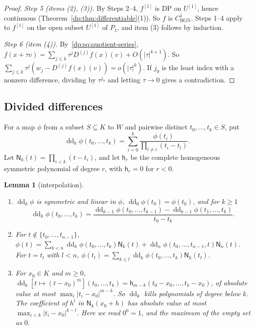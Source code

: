 \documentclass[11pt]{amsart}
\newtheorem{lemma}[theorem]{Lemma}
\theoremstyle{definition}
\theoremstyle{remark}
\numberwithin{equation}{section}
\newcommand{\abs}[1]{\lvert #1\rvert}
\theoremstyle{plain}
\theoremstyle{definition}
\theoremstyle{plain}
\begin{document}
\begin{proof}
\emph{Step 5 (items (2), (3)).} By Steps 2--4, $f^{[1]}$ is DP on $U^{[1]}$, hence continuous (Theorem~\ref{dp:thm:differentiable}(1)). So $f$ is $C^1_{\mathrm{BGN}}$. Steps 1--4 apply to $f^{[1]}$ on the open subset $U^{[1]}$ of $P_1$, and item (3) follows by induction.

\emph{Step 6 (item (4)).} By~\eqref{dp:sq:quotient-series}, $f(x+\tau v)=\sum_{j\le k}\tau^jD^{(j)}f(x)(v)+O(\abs\tau^{k+1})$. So $\sum_{j\le k}\tau^j(w_j-D^{(j)}f(x)(v))=o(\abs\tau^k)$. If $j_0$ is the least index with a nonzero difference, dividing by $\tau^{j_0}$ and letting $\tau\to0$ gives a contradiction.
\end{proof}

\subsection{Divided differences}\label{dp:sq:ssec-divided}

For a map $\phi$ from a subset $S\subseteq K$ to $W$ and pairwise distinct $t_0,\dots,t_k\in S$, put
\[
 \operatorname{dd}_k\phi(t_0,\dots,t_k)=\sum_{i=0}^k\frac{\phi(t_i)}{\prod_{l\ne i}(t_i-t_l)}.
\]
Let $\mathsf N_k(t)=\prod_{i<k}(t-t_i)$, and let $\mathsf h_r$ be the complete homogeneous symmetric polynomial of degree $r$, with $\mathsf h_r=0$ for $r<0$.

\begin{lemma}[interpolation]\label{dp:sq:interpolation}
\leavevmode
\begin{enumerate}
\item $\operatorname{dd}_k\phi$ is symmetric and linear in $\phi$, $\operatorname{dd}_0\phi(t_0)=\phi(t_0)$, and for $k\ge1$
\begin{equation}\label{dp:sq:dd-recursion}
 \operatorname{dd}_k\phi(t_0,\dots,t_k)=\frac{\operatorname{dd}_{k-1}\phi(t_0,\dots,t_{k-1})-\operatorname{dd}_{k-1}\phi(t_1,\dots,t_k)}{t_0-t_k}.
\end{equation}
\item For $t\notin\{t_0,\dots,t_{n-1}\}$,
$\phi(t)=\sum_{k<n}\operatorname{dd}_k\phi(t_0,\dots,t_k)\mathsf N_k(t)+\operatorname{dd}_n\phi(t_0,\dots,t_{n-1},t)\mathsf N_n(t)$. For $t=t_l$ with $l<n$, $\phi(t_l)=\sum_{k\le l}\operatorname{dd}_k\phi(t_0,\dots,t_k)\mathsf N_k(t_l)$.
\item For $x_0\in K$ and $m\ge0$, $\operatorname{dd}_k[t\mapsto(t-x_0)^m](t_0,\dots,t_k)=\mathsf h_{m-k}(t_0-x_0,\dots,t_k-x_0)$, of absolute value at most $\max_i\abs{t_i-x_0}^{m-k}$. So $\operatorname{dd}_k$ kills polynomials of degree below $k$. The coefficient of $h^l$ in $\mathsf N_k(x_0+h)$ has absolute value at most $\max_{i<k}\abs{t_i-x_0}^{k-l}$. Here we read $0^0=1$, and the maximum of the empty set as $0$.
\end{enumerate}
\end{lemma}
\end{document}
